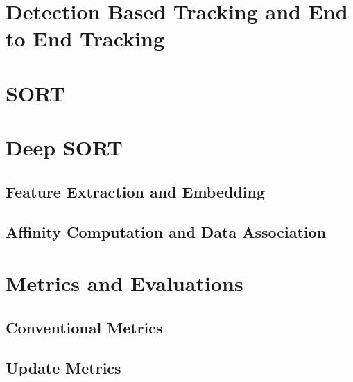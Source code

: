\section{Detection Based Tracking and End to End Tracking}

\section{SORT}

\section{Deep SORT}

    \subsection{Feature Extraction and Embedding}

    \subsection{Affinity Computation and Data Association}

\section{Metrics and Evaluations}

    \subsection{Conventional Metrics}

    \subsection{Update Metrics}